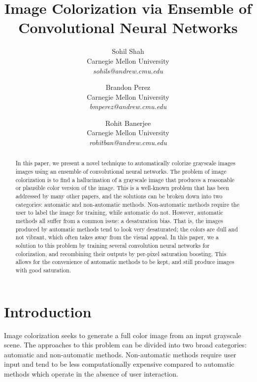 \documentclass[10pt,twocolumn,letterpaper]{article}
\begin{document}
\title{Image Colorization via Ensemble of Convolutional Neural Networks}

\author{
    Sohil Shah \\
    Carnegie Mellon University \\
    \textit{\small sohils@andrew.cmu.edu} \\
    \and
    Brandon Perez \\
    Carnegie Mellon University \\
    \textit{\small bmperez@andrew.cmu.edu} \\
    \and
    Rohit Banerjee \\
    Carnegie Mellon University \\
    \textit{\small rohitban@andrew.cmu.edu} \\
}

\maketitle


\begin{abstract}
    In this paper, we present a novel technique to automatically colorize grayscale images images using an ensemble of convolutional neural networks. The problem of image colorization is to find a hallucination of a grayscale image that produces a reasonable or plausible color version of the image. This is a well-known problem that has been addressed by many other papers, and the solutions can be broken down into two categories: automatic and non-automatic methods. Non-automatic methods require the user to label the image for training, while automatic do not. However, automatic methods all suffer from a common issue: a desaturation bias. That is, the images produced by automatic methods tend to look very desaturated; the colors are dull and not vibrant, which often takes away from the visual appeal. In this paper, we a solution to this problem by training several convolution neural networks for colorization, and recombining their outputs by per-pixel saturation boosting. This allows for the convenience of automatic methods to be kept, and still produce images with good saturation.
\end{abstract}

\section{Introduction}
Image colorization seeks to generate a full color image from an input grayscale scene. The approaches to this problem can be divided into two broad categories: automatic and non-automatic methods. Non-automatic methods require user input and tend to be less computationally expensive compared to automatic methods which operate in the absence of user interaction.
\end{document}
